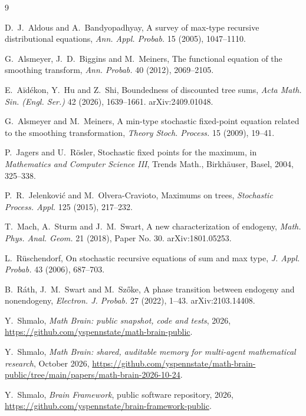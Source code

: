 \documentclass[11pt]{amsart}
\theoremstyle{remark}
\begin{document}
\begin{thebibliography}{9}

D.~J.~Aldous and A.~Bandyopadhyay, A survey of max-type recursive distributional
equations, \emph{Ann. Appl. Probab.} 15 (2005), 1047--1110.

G.~Alsmeyer, J.~D.~Biggins and M.~Meiners, The functional equation of the smoothing
transform, \emph{Ann. Probab.} 40 (2012), 2069--2105.

E.~A\"id\'ekon, Y.~Hu and Z.~Shi, Boundedness of discounted tree sums, \emph{Acta Math. Sin.
(Engl. Ser.)} 42 (2026), 1639--1661. arXiv:2409.01048.

G.~Alsmeyer and M.~Meiners, A min-type stochastic fixed-point equation related to the
smoothing transformation, \emph{Theory Stoch. Process.} 15 (2009), 19--41.

P.~Jagers and U.~R\"osler, Stochastic fixed points for the maximum, in
\emph{Mathematics and Computer Science III}, Trends Math., Birkh\"auser, Basel, 2004,
325--338.

P.~R.~Jelenkovi\'c and M.~Olvera-Cravioto, Maximums on trees, \emph{Stochastic Process.
Appl.} 125 (2015), 217--232.

T.~Mach, A.~Sturm and J.~M.~Swart, A new characterization of endogeny, \emph{Math. Phys.
Anal. Geom.} 21 (2018), Paper No. 30. arXiv:1801.05253.

L.~R\"uschendorf, On stochastic recursive equations of sum and max type, \emph{J. Appl.
Probab.} 43 (2006), 687--703.

B.~R\'ath, J.~M.~Swart and M.~Sz\H{o}ke, A phase transition between endogeny and
nonendogeny, \emph{Electron. J. Probab.} 27 (2022), 1--43. arXiv:2103.14408.

 Y.~Shmalo, \emph{Math Brain: public snapshot, code and tests}, 2026, \url{https://github.com/yspennstate/math-brain-public}.

 Y.~Shmalo, \emph{Math Brain: shared, auditable memory for multi-agent mathematical research}, October 2026, \url{https://github.com/yspennstate/math-brain-public/tree/main/papers/math-brain-2026-10-24}.

 Y.~Shmalo, \emph{Brain Framework}, public software repository, 2026, \url{https://github.com/yspennstate/brain-framework-public}.

\end{thebibliography}
\end{document}
